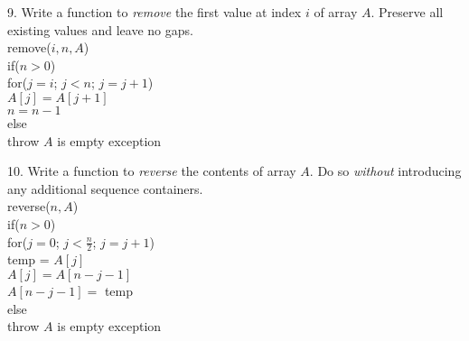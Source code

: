 \documentclass[12pt]{article}
\begin{document}
\begin{flushleft}
9. Write a function to \textit{remove} the first value at index $i$ of array $A$. Preserve all existing values and leave no gaps.\\[.5in]
remove($i,n,A$)\\
\quad if($n>0$) \\
\qquad for($j=i$; $j<n$; $j=j+1$)\\
\quad \qquad $A[j]=A[j+1]$\\
\qquad $n=n-1$\\
\quad else \\
\qquad throw $A$ is empty exception
\newpage

10. Write a function to \textit{reverse} the contents of array $A$. Do so \textit{without} introducing any additional sequence containers.\\[.5in]
reverse($n,A$)\\
\quad if($n>0$)\\
\qquad for($j=0$; $j<\frac{n}{2}$; $j=j+1$)\\
\quad \qquad temp = $A[j]$\\
\quad \qquad $A[j] = A[n-j-1]$\\
\quad \qquad $A[n-j-1]=$ temp\\
\quad else \\
\qquad throw $A$ is empty exception

\end{flushleft}
\end{document}

